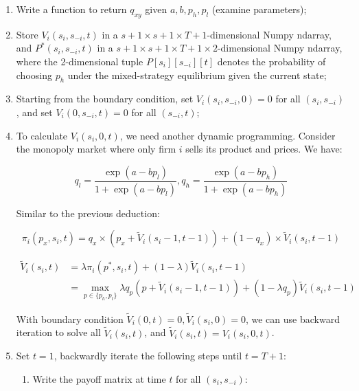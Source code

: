 \documentclass[12pt,letterpaper]{article}
\begin{document}
\begin{enumerate}
    \item Write a function to return $q_{xy}$ given $a, b, p_h, p_l$ (examine parameters);
    \item Store $V_i(s_i,s_{-i},t)$ in a $s+1\times s+1\times T+1$-dimensional Numpy ndarray, and $P^*(s_i, s_{-i}, t)$ in a $s+1\times s+1\times T+1 \times 2$-dimensional Numpy ndarray, where the 2-dimensional tuple $P[s_{i}][s_{-i}][t]$ denotes the probability of choosing $p_h$ under the mixed-strategy equilibrium given the current state;
    \item Starting from the boundary condition, set $V_i(s_i, s_{-i}, 0)=0$ for all $(s_i, s_{-i})$, and set $V_i(0, s_{-i}, t)=0$ for all $(s_{-i}, t)$;
    \item To calculate $V_i(s_i,0,t)$, we need another dynamic programming. Consider the monopoly market where only firm $i$ sells its product and prices. We have:
    
    \[
        q_{l} = \frac{\exp(a-bp_l)}{1+\exp(a-bp_l)}, q_{h} = \frac{\exp(a-bp_h)}{1+\exp(a-bp_h)}
    \]

    Similar to the previous deduction:
    
    \[  
        \pi_i(p_x,s_i,t) = q_x \times  (p_x+\tilde{V}_i(s_i-1,t-1)) + (1-q_x) \times \tilde{V}_i(s_i,t-1)
    \]
    
    \[
        \begin{align}
            \tilde{V}_i(s_i,t) &= \lambda \pi_i(p^*,s_i,t) + (1-\lambda) \tilde{V}_i(s_i,t-1) \\
            &= \max_{p\in\{p_h,p_l\}} \lambda q_p (p+\tilde{V}_i(s_i-1,t-1)) + (1-\lambda q_p) \tilde{V}_i(s_i,t-1)
        \end{align}
        
    \]

    With boundary condition $\tilde{V}_i(0,t)=0, \tilde{V}_i(s_i,0)=0$, we can use backward iteration to solve all $\tilde{V}_i(s_i,t)$, and $\tilde{V}_i(s_i,t)= V_i(s_i,0,t)$.
    \item Set $t=1$, backwardly iterate the following steps until $t=T+1$:
    
    \begin{enumerate}
        \item Write the payoff matrix at time $t$ for all $(s_i,s_{-i})$:
        

\end{enumerate}
\end{enumerate}
\end{document}
